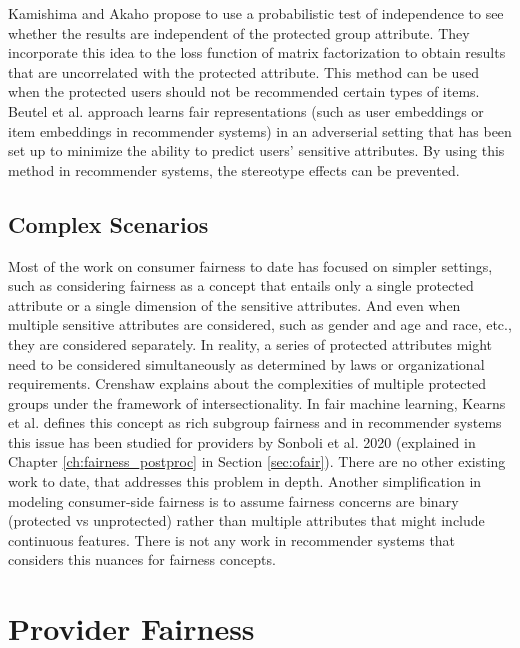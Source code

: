         Kamishima and Akaho \cite{kamishima2017considerations, kamishima2018recommendation} propose to use a probabilistic test of independence to see whether the results are independent of the protected group attribute. They incorporate this idea to the loss function of matrix factorization to obtain results that are uncorrelated with the protected attribute. This method can be used when the protected users should not be recommended certain types of items. Beutel et al.\cite{beutel2017data} approach learns fair representations (such as user embeddings or item embeddings in recommender systems) in an adverserial setting that has been set up to minimize the ability to predict users' sensitive attributes. By using this method in recommender systems, the stereotype effects can be prevented.
    
    \subsection{Complex Scenarios}
        Most of the work on consumer fairness to date has focused on simpler settings, such as considering fairness as a concept that entails only a single protected attribute or a single dimension of the sensitive attributes. And even when multiple sensitive attributes are considered, such as gender and age and race, etc., they are considered separately. In reality, a series of protected attributes might need to be considered simultaneously as determined by laws or organizational requirements. Crenshaw \cite{crenshaw1989demarginalizing} explains about the complexities of multiple protected groups under the framework of intersectionality. In fair machine learning, Kearns et al. \cite{kearns2019empirical} defines this concept as rich subgroup fairness and in recommender systems this issue has been studied for providers by Sonboli et al. 2020 \cite{sonboli2020opportunistic}  (explained in Chapter \ref{ch:fairness_postproc} in Section \ref{sec:ofair}). There are no other existing work to date, that addresses this problem in depth. Another simplification in modeling consumer-side fairness is to assume fairness concerns are binary (protected vs unprotected) rather than multiple attributes that might include continuous features. There is not any work in recommender systems that considers this nuances for fairness concepts.


\section{Provider Fairness}


